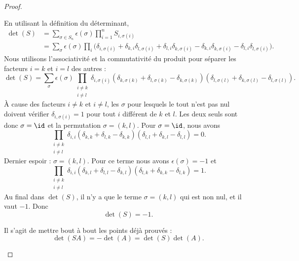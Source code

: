 \begin{proof}
\begin{subproof}
		\spitem[\ref{ITEMooSHRQooQrqVdO}]
		En utilisant la définition du déterminant,
		\begin{subequations}
			\begin{align}
				\det(S) & =\sum_{\sigma\in S_n}\epsilon(\sigma)\prod_{i=1}^n S_{i,\sigma(i)}                                                                                                                                         \\
				        & =\sum_{\sigma}\epsilon(\sigma)\prod_i\big( \delta_{i,\sigma(i)}+\delta_{k,i}\delta_{l,\sigma(i)}+\delta_{l,i}\delta_{k,\sigma(i)}-\delta_{k,i}\delta_{k,\sigma(i)}-\delta_{l,i}\delta_{l,\sigma(i)} \big).
			\end{align}
		\end{subequations}
		Nous utilisons l'associativité et la commutativité du produit pour séparer les facteurs \( i=k\) et \( i=l\) des autres :
		\begin{equation}
			\det(S)=\sum_{\sigma}\epsilon(\sigma)\prod_{\substack{i\neq k \\i\neq l}}\delta_{i,\sigma(i)}(\delta_{k,\sigma(k)}+\delta_{l,\sigma(k)}-\delta_{k,\sigma(k)})(\delta_{l,\sigma(l)}+\delta_{k,\sigma(l)}-\delta_{l,\sigma(l)}).
		\end{equation}
		À cause des facteurs \( i\neq k\) et \( i\neq l\), les \( \sigma\) pour lesquels le tout n'est pas nul doivent vérifier \( \delta_{i,\sigma(i)}=1\) pour tout \( i\) différent de \( k\) et \( l\). Les deux seuls sont donc \( \sigma=\id\) et la permutation \( \sigma=(k,l)\). Pour \( \sigma=\id\), nous avons
		\begin{equation}
			\prod_{\substack{i\neq k \\i\neq l}}\delta_{i,i}(\delta_{k,k}+\delta_{l,k}-\delta_{k,k})(\delta_{l,l}+\delta_{k,l}-\delta_{l,l})=0.
		\end{equation}
		Dernier espoir : \( \sigma=(k,l)\). Pour ce terme nous avons \( \epsilon(\sigma)=-1\) et
		\begin{equation}
			\prod_{\substack{i\neq k \\i\neq l}}\delta_{i,i}(\delta_{k,l}+\delta_{l,l}-\delta_{k,l})(\delta_{l,k}+\delta_{k,k}-\delta_{l,k})=1.
		\end{equation}
		Au final dans \( \det(S)\), il n'y a que le terme \( \sigma=(k,l)\) qui est non nul, et il vaut \( -1\). Donc
		\begin{equation}
			\det(S)=-1.
		\end{equation}

		\spitem[\ref{ITEMooQXSEooMWiKbL}]
		Il s'agit de mettre bout à bout les points déjà prouvés :
		\begin{equation}
			\det(SA)=-\det(A)=\det(S)\det(A).
		\end{equation}
	\end{subproof}
\end{proof}

